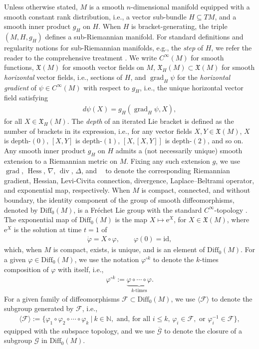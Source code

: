\documentclass{article}
\theoremstyle{remark}
\newcommand{\M}{M}
\newcommand{\Cinf}{C^{\infty}(\M)}
\newcommand{\X}{\mathfrak{X}(\M)}
\newcommand{\XH}{\mathfrak{X}_H(\M)}
\newcommand{\Diff}{\mathrm{Diff}_0(\M)}
\DeclareMathOperator{\grad}{\mathrm{grad}}
\DeclareMathOperator{\expg}{\mathrm{exp}^{\text{$g$}}}
\DeclareMathOperator{\Div}{div}
\DeclareMathOperator{\Hess}{Hess}
\begin{document}
Unless otherwise stated, $\M$ is a smooth $n$-dimensional manifold equipped with a smooth constant rank distribution, i.e., a vector sub-bundle $H\subseteq T\M$, and a smooth inner product $g_H$ on $H$. When $H$ is bracket-generating, the triple $(\M,H,g_H)$ defines a sub-Riemannian manifold. For standard definitions and regularity notions for sub-Riemannian manifolds, e.g., the \emph{step} of $H$, we refer the reader to the comprehensive treatment \cite{AgrachevBarilariBoscain2020}. 
%
We write $\Cinf$ for smooth functions, $\X$ for smooth vector fields on $\M$, $\XH\subset\X$ for smooth \emph{horizontal} vector fields, i.e., sections of $H$, and $\grad_H\psi$ for the \emph{horizontal gradient} of $\psi\in\Cinf$ with respect to $g_H$, i.e., the unique horizontal vector field satisfying
%
\begin{align}
    d\psi(X) = g_H(\grad_H\psi,X),
\end{align}
%
for all $X\in\XH$. The \emph{depth} of an iterated Lie bracket is defined as the number of brackets in its expression, i.e., for any vector fields $X,Y\in \X$, $X$ is depth-$(0)$, $[X,Y]$ is depth-$(1)$, $[X,[X,Y]]$ is depth-$(2)$, and so on. Any smooth inner product $g_H$ on $H$ admits a (not necessarily unique) smooth extension to a Riemannian metric on $\M$. Fixing any such extension $g$, we use $\grad$, $\Hess$, $\nabla$, $\Div$, $\Delta$, and $\expg$ to denote the corresponding Riemannian gradient, Hessian, Levi-Civita connection, divergence, Laplace--Beltrami operator, and exponential map, respectively.
%
When $\M$ is compact, connected, and without boundary, the identity component of the group of smooth diffeomorphisms, denoted by $\Diff$, is a Fr\'echet Lie group with the standard $C^\infty$-topology \cite{Hamilton1982}. The exponential map of $\Diff$ is the map $X\mapsto \mathrm{e}^{X}$, for $X\in\mathfrak{X}(\M)$, where $\mathrm{e}^{X}$ is the solution at time $t=1$ of
%
\begin{align}
    \dot{\varphi} = X\circ \varphi, \qquad \varphi(0) = \mathrm{id},
\end{align}
%
which, when $\M$ is compact, exists, is unique, and is an element of $\Diff$. For a given $\varphi\in\Diff$, we use the notation $\varphi^{\circ k}$ to denote the $k$-times composition of $\varphi$ with itself, i.e., 
%
\begin{align*}
    \varphi^{\circ k}:= \underbrace{\varphi \circ \cdots \circ \varphi}_{k\text{-times}}.
\end{align*}
%
For a given family of diffeomorphisms $\mathcal{F}\subset\Diff$, we use $\langle \mathcal{F}\rangle$ to denote the subgroup generated by $\mathcal{F}$, i.e., 
%
\begin{align*}
    \langle \mathcal{F}\rangle :=\{\varphi_1\circ\varphi_2\circ\cdots\circ \varphi_k ~|~ k \in\mathbb{N}, \text{ and, for all  $i\leq k$, } \varphi_i\in \mathcal{F}, \text{ or } \varphi_i^{-1}\in \mathcal{F}\},
\end{align*}
%
equipped with the subspace topology, and we use $\overline{\mathcal{G}}$ to denote the closure of a subgroup $\mathcal{G}$ in $\Diff$. 
\end{document}
